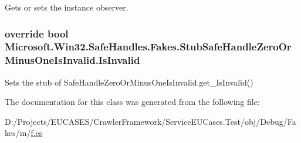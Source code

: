 Gets or sets the instance observer.

\hypertarget{class_microsoft_1_1_win32_1_1_safe_handles_1_1_fakes_1_1_stub_safe_handle_zero_or_minus_one_is_invalid_a1c6daf2fb0ec62b9d18007f69c6f1f86}{
\subsubsection[{Is\-Invalid}]{\setlength{\rightskip}{0pt plus 5cm}override bool Microsoft.\-Win32.\-Safe\-Handles.\-Fakes.\-Stub\-Safe\-Handle\-Zero\-Or\-Minus\-One\-Is\-Invalid.\-Is\-Invalid\hspace{0.3cm}{\ttfamily [get]}}}\label{class_microsoft_1_1_win32_1_1_safe_handles_1_1_fakes_1_1_stub_safe_handle_zero_or_minus_one_is_invalid_a1c6daf2fb0ec62b9d18007f69c6f1f86}


Sets the stub of Safe\-Handle\-Zero\-Or\-Minus\-One\-Is\-Invalid.\-get\-\_\-\-Is\-Invalid()



The documentation for this class was generated from the following file\-:\begin{DoxyCompactItemize}
\item 
D\-:/\-Projects/\-E\-U\-C\-A\-S\-E\-S/\-Crawler\-Framework/\-Service\-E\-U\-Cases.\-Test/obj/\-Debug/\-Fakes/m/\hyperlink{m_2f_8cs}{f.\-cs}\end{DoxyCompactItemize}
